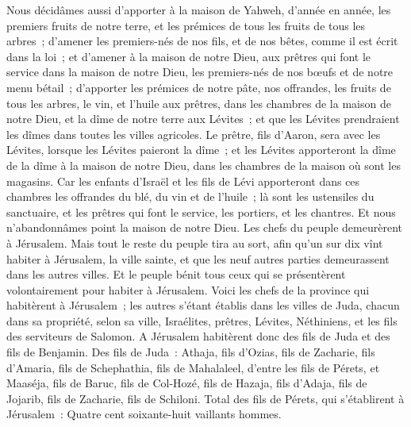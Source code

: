 \begin{multicols}{2}
Nous décidâmes aussi d'apporter à la maison de Yahweh, d'année en année, les premiers fruits de notre terre, et les prémices de tous les fruits de tous les arbres~;
d'amener les premiers-nés de nos fils, et de nos bêtes, comme il est écrit dans la loi~; et d'amener à la maison de notre Dieu, aux prêtres qui font le service dans la maison de notre Dieu, les premiers-nés de nos bœufs et de notre menu bétail~;
d'apporter les prémices de notre pâte, nos offrandes, les fruits de tous les arbres, le vin, et l'huile aux prêtres, dans les chambres de la maison de notre Dieu, et la dîme de notre terre aux Lévites~; et que les Lévites prendraient les dîmes dans toutes les villes agricoles.
Le prêtre, fils d'Aaron, sera avec les Lévites, lorsque les Lévites paieront la dîme~; et les Lévites apporteront la dîme de la dîme à la maison de notre Dieu, dans les chambres de la maison où sont les magasins.
Car les enfants d'Israël et les fils de Lévi apporteront dans ces chambres les offrandes du blé, du vin et de l'huile~; là sont les ustensiles du sanctuaire, et les prêtres qui font le service, les portiers, et les chantres. Et nous n'abandonnâmes point la maison de notre Dieu.
\VerseOne{}Les chefs du peuple demeurèrent à Jérusalem. Mais tout le reste du peuple tira au sort, afin qu'un sur dix vînt habiter à Jérusalem, la ville sainte, et que les neuf autres parties demeurassent dans les autres villes.
Et le peuple bénit tous ceux qui se présentèrent volontairement pour habiter à Jérusalem.
Voici les chefs de la province qui habitèrent à Jérusalem~; les autres s'étant établis dans les villes de Juda, chacun dans sa propriété, selon sa ville, Israélites, prêtres, Lévites, Néthiniens, et les fils des serviteurs de Salomon.
A Jérusalem habitèrent donc des fils de Juda et des fils de Benjamin. Des fils de Juda~: Athaja, fils d'Ozias, fils de Zacharie, fils d'Amaria, fils de Schephathia, fils de Mahalaleel, d'entre les fils de Pérets,
et Maaséja, fils de Baruc, fils de Col-Hozé, fils de Hazaja, fils d'Adaja, fils de Jojarib, fils de Zacharie, fils de Schiloni.
Total des fils de Pérets, qui s'établirent à Jérusalem~: Quatre cent soixante-huit vaillants hommes.

\end{multicols}
